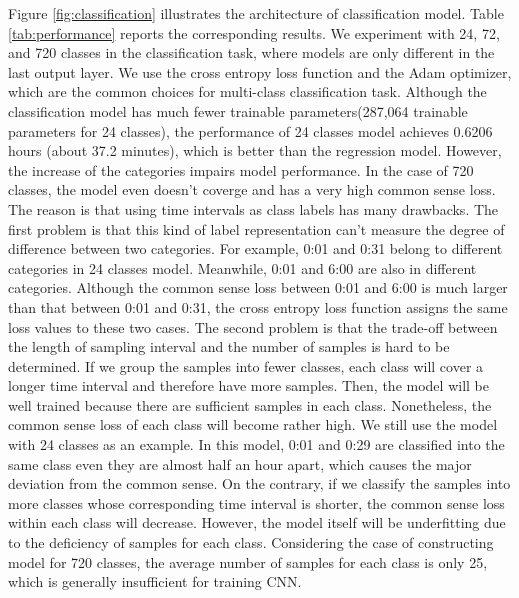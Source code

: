 \documentclass{article}
\begin{document}
Figure \ref{fig:classification} illustrates the architecture of classification model. Table \ref{tab:performance} reports the corresponding results. We experiment with 24, 72, and 720 classes in the classification task, where models are only different in the last output layer. We use the cross entropy loss function and the Adam optimizer, which are the common choices for multi-class classification task. Although the classification model has much fewer trainable parameters(287,064 trainable parameters for 24 classes), the performance of 24 classes model achieves 0.6206 hours (about 37.2 minutes), which is better than the regression model. However, the increase of the categories impairs model performance. In the case of 720 classes, the model even doesn't coverge and has a very high common sense loss. The reason is that using time intervals as class labels has many drawbacks. The first problem is that this kind of label representation can't measure the degree of difference between two categories. For example, 0:01 and 0:31 belong to different categories in 24 classes model. Meanwhile, 0:01 and 6:00 are also in different categories. Although the common sense loss between 0:01 and 6:00 is much larger than that between 0:01 and 0:31, the cross entropy loss function assigns the same loss values to these two cases. The second problem is that the trade-off between the length of sampling interval and the number of samples is hard to be determined. If we group the samples into fewer classes, each class will cover a longer time interval and therefore have more samples. Then, the model will be well trained because there are sufficient samples in each class. Nonetheless, the common sense loss of each class will become rather high. We still use the model with 24 classes as an example. In this model, 0:01 and 0:29 are classified into the same class even they are almost half an hour apart, which causes the major deviation from the common sense. On the contrary, if we classify the samples into more classes whose corresponding time interval is shorter, the common sense loss within each class will decrease. However, the model itself will be underfitting due to the deficiency of samples for each class. Considering the case of constructing model for 720 classes, the average number of samples for each class is only 25, which is generally insufficient for training CNN.
\end{document}
